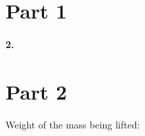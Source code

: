 

\usepackage{enumitem}
\usepackage{graphicx}
\graphicspath{ {./lab02images/} }


\renewcommand\assignment{Lab 4: Simple Machine, 2/21/2023, Partners: Maite Valentin-Lugo, Seth Waln}



    \iffalse
    \begin{equation*}
        \begin{gathered}
            Equations go here.
        \end{gathered}
    \end{equation*}

    \resizebox{\hsize}{!}{$Long equation goes here$}

    \begin{multicol*}{# of columns}
    \end{multicol*}

    \horizontal

    \fi


    \section*{Part 1}

    \paragraph*{2.}


    \pagebreak

    \section*{Part 2}

    Weight of the mass being lifted: 

